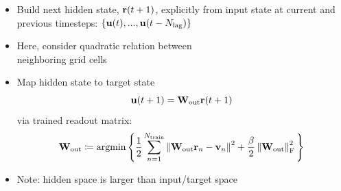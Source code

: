 \begin{minipage}{\textwidth}
\end{minipage}


\begin{itemize}
    \item Build next hidden state, $\mathbf{r}(t+1)$, explicitly from input state
        at current and previous timesteps:
        $\{\mathbf{u}(t), ..., \mathbf{u}(t-N_\text{lag})\}$
    \item Here, consider quadratic relation between\\neighboring grid cells
    \item Map hidden state to target state
        \begin{equation*}
            \mathbf{u}(t+1) = \mathbf{W}_\text{out} \mathbf{r}(t+1)
        \end{equation*}
        via trained readout matrix:
        \vspace{.5em}
        \begin{equation*}
            \mathbf{W}_\text{out} \coloneqq \operatorname*{argmin} \left\{
                \dfrac{1}{2}\sum_{n=1}^{N_\text{train}} \left\lVert\mathbf{W}_\text{out} \mathbf{r}_n - \mathbf{v}_n\right\rVert^2
                +
                \dfrac{\beta}{2}\left\lVert\mathbf{W}_\text{out}\right\rVert_\text{F}^2 \, \right\}
        \end{equation*}
    \item Note: hidden space is larger than input/target space
\end{itemize}

